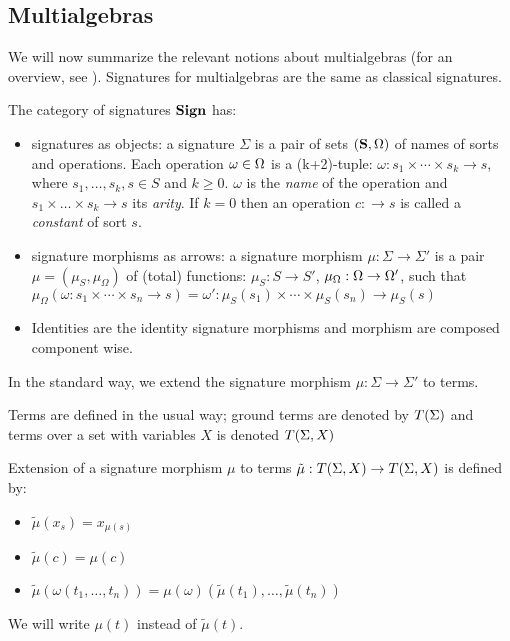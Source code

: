 \documentclass[10pt]{article}
\begin{document}
\subsection{Multialgebras}
We will now summarize the relevant notions about multialgebras (for an
overview, see \cite{multi,catrel}). %
Signatures for multialgebras are the same as classical signatures.
%
\begin{definition}\label{de:Sign}
The category of signatures ${\bf Sign}$ has:
\begin{itemize}\MyLPar
\item signatures as objects: a signature
$\Sigma$ is a pair of sets $({\bf S},\Omega)$ of names of sorts and
operations. Each operation $\omega\in\Omega$ is a (k+2)-tuple:
$\omega : s_1 \times \cdots \times s_k \to s$,
where {$s_1, \ldots , s_k,s \in S$ and $k \geq 0$}.  $\omega$ is the
{\it name} of the operation and $s_1 \times \ldots \times s_k \to s$ its {\it
arity}. If $ k=0$ then an operation $c: \to s$ is called a {\it constant} of
sort $s$.
\item  signature morphisms as arrows: 
a signature morphism $\mu: \Sigma \to \Sigma'$ is a pair $\mu = (\mu_S,
\mu_{\Omega})$ of (total) functions:
$\mu_S: S \to S'$, $\mu_{\Omega}: \Omega \to \Omega'$, 
such that 
$ \mu_{\Omega}(\omega:s_1 \times \cdots \times s_n \to s) =
\omega':\mu_S(s_1) \times \cdots \times \mu_S(s_n) \to \mu_S(s)$
\item
Identities are the identity
signature morphisms and morphism are composed component wise.
\end{itemize}
\end{definition}
%
In the standard way, 
we extend the signature morphism $\mu : \Sigma \to \Sigma'$ to terms.

Terms are defined in the usual way; ground terms are denoted by $T(\Sigma)$ and terms over a set with variables $X$ is denoted $T(\Sigma,X)$
\begin{definition} Extension of a
signature morphism $\mu$ to terms ${\tilde{\mu}} : T(\Sigma,X) \to T(\Sigma,X)$ is defined by:
\begin{itemize}\MyLPar
\item ${\tilde{\mu}} (x_s) = x_{\mu (s)}$
\item ${\tilde{\mu}} (c) = \mu(c)$
\item ${\tilde{\mu}} (\omega(t_1, \ldots ,t_n )) = \mu(\omega)({\tilde{\mu}}(t_1), \ldots , {\tilde{\mu}}(t_n))$
\end{itemize}
\end{definition}
We will write $\mu(t)$
instead of ${\tilde{\mu}}(t)$.
\end{document}
